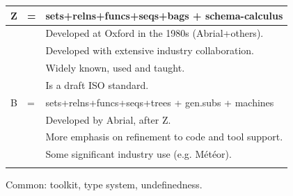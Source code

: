 \begin{slide}\label{history}%
\begin{tabular}{lll}
Z & = & sets+relns+funcs+seqs+bags + schema-calculus \\
\hline
  && Developed at Oxford in the 1980s (Abrial+others). \\
  && Developed with extensive industry collaboration. \\
  && Widely known, used and taught. \\
  && Is a draft ISO standard. \\[1ex]
B &=& sets+relns+funcs+seqs+trees + gen.subs + machines \\
\hline
  && Developed by Abrial, after Z. \\
  && More emphasis on refinement to code and tool support. \\
  && Some significant industry use (e.g. M\'{e}t\'{e}or). \\
\\
\end{tabular}
Common: toolkit, type system, undefinedness.
\end{slide}

